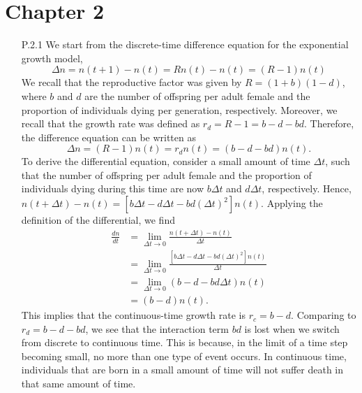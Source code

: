 \section{Chapter 2}

\begin{enumerate}
	\item[P.2.1] We start from the discrete-time difference equation for the exponential growth model,
		\begin{equation}
			\Delta n = n(t+1) - n(t) = R n(t) - n(t) = (R - 1) n(t)
		\end{equation}
		We recall that the reproductive factor was given by $R = (1+b)(1-d)$, where $b$ and $d$ are the number of offspring per adult female and the proportion of individuals dying per generation, respectively. Moreover, we recall that the growth rate was defined as $r_d = R - 1 = b - d - b d$. Therefore, the difference equation can be written as
		\begin{equation}
			\Delta n = (R - 1) n(t) = r_d n(t) = (b - d - b d) n(t).
		\end{equation}
		To derive the differential equation, consider a small amount of time $\Delta t$, such that the number of offspring per adult female and the proportion of individuals dying during this time are now $b \Delta t$ and $d \Delta t$, respectively. Hence, $n(t+\Delta t) - n(t) = \left[b \Delta t - d \Delta t - b d (\Delta t)^2  \right] n(t)$. Applying the definition of the differential, we find
		\begin{equation}
		\begin{split}
			\frac{dn}{dt} & = \lim_{\Delta t \rightarrow 0} \frac{n(t+\Delta t) - n(t)}{\Delta t}\\
			& =  \lim_{\Delta t \rightarrow 0} \frac{\left[b \Delta t - d \Delta t - b d (\Delta t)^2  \right] n(t)}{\Delta t} \\
			& =  \lim_{\Delta t \rightarrow 0} (b - d - b d \Delta t) n(t)\\
			& = (b - d) n(t).
		\end{split}
		\end{equation}
		This implies that the continuous-time growth rate is $r_c = b - d$. Comparing to $r_d = b - d - bd$, we see that the interaction term $b d$ is lost when we switch from discrete to continuous time. This is because, in the limit of a time step becoming small, no more than one type of event occurs. In continuous time, individuals that are born in a small amount of time will not suffer death in that same amount of time.
		

\end{enumerate}
